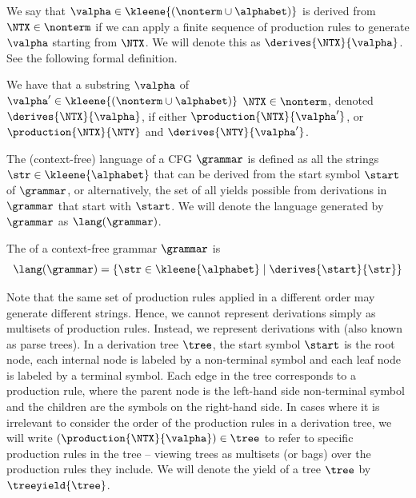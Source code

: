 We say that $\valpha\in\kleene{(\nonterm\cup \alphabet)}$ is derived from $\NTX\in\nonterm$ if we can apply a finite sequence of production rules to generate $\valpha$ starting from $\NTX$.
We will denote this as $\derives{\NTX}{\valpha}$.
See the following formal definition.
\begin{definition}[Derives]
We have that a substring $\valpha$ of $\valpha'\in\kleene{(\nonterm\cup \alphabet)}$  $\NTX\in\nonterm$, denoted $\derives{\NTX}{\valpha}$, if either $\production{\NTX}{\valpha'}$, or $\production{\NTX}{\NTY}$ and $\derives{\NTY}{\valpha'}$.
\end{definition}
The (context-free) language of a CFG $\grammar$ is defined as all the strings $\str\in\kleene{\alphabet}$ that can be derived from the start symbol $\start$ of $\grammar$, or alternatively, the set of all yields possible from derivations in $\grammar$ that start with $\start$. We will denote the language generated by $\grammar$ as $\lang(\grammar)$. 

\begin{definition}
    The  of a context-free grammar $\grammar$ is 
\begin{equation}
    \lang(\grammar)=\{\str\in\kleene{\alphabet}\mid \derives{\start}{\str}\}
\end{equation}
\end{definition}

Note that the same set of production rules applied in a different order may generate different strings. Hence, we cannot represent derivations simply as multisets of production rules. Instead, we represent derivations with  
(also known as parse trees). 
In a derivation tree $\tree$, the start symbol $\start$ is the root node, each internal node is labeled by a non-terminal symbol and each leaf node is labeled by a terminal symbol. Each edge in the tree corresponds to a production rule, where the parent node is the left-hand side non-terminal symbol and the children are the symbols on the right-hand side. In cases where it is irrelevant to consider the order of the production rules in a derivation tree, we will write $(\production{\NTX}{\valpha})\in\tree$ to refer to specific production rules in the tree -- viewing trees as multisets (or bags) over the production rules they include. We will denote the yield of a tree $\tree$ by $\treeyield{\tree}$.

